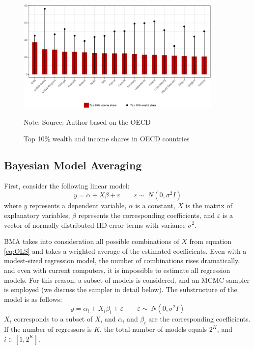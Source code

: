 \documentclass[a4paper,11pt]{article}
\begin{document}
\begin{figure}[ht!]
	\caption{Top 10\% wealth and income shares in \ac{OECD} countries}
	\centering
	\includegraphics[width=0.9\textwidth]{figures/wealthincome_comp_oecd.eps}
	\label{fig:wealthincome_comp_oecd}
	
	Note: Source: Author based on the \ac{OECD}
\end{figure}

\newpage
\subsection*{Bayesian Model Averaging}
\label{sec:app_bma}
First, consider the following linear model:
%
\begin{equation}
\label{eq:OLS}
y = \alpha + X\beta+ \varepsilon \qquad \varepsilon  \sim\ N(0, \sigma^{2}I)
\end{equation}
%
where $y$ represents a dependent variable, $\alpha$ is a constant, $X$ is the matrix of explanatory variables, $\beta$ represents the corresponding coefficients, and $\varepsilon$ is a vector of normally distributed IID error terms with variance $\sigma^{2}$. 

\ac{BMA} takes into consideration all possible combinations of $X$ from equation \ref{eq:OLS} and takes a weighted average of the estimated coefficients. Even with a modest-sized regression model, the number of combinations rises dramatically, and even with current computers, it is impossible to estimate all regression models. For this reason, a subset of models is considered, and an MCMC sampler is employed (we discuss the sampler in detail below). The substructure of the model is as follows:
%
\begin{equation}\label{eq:OLSsub}
y = \alpha_{i} + X_{i}\beta_{i}+ \varepsilon \qquad \varepsilon  \sim\ N(0, \sigma^{2}I)
\end{equation}
%
$X_{i}$ corresponds to a subset of $X$, and $\alpha_{i} $ and $ \beta_{i}$ are the corresponding coefficients. If the number of regressors is $K$, the total number of models equals $2^{K}$, and $i \in [1,2^{K}]$. 
\end{document}
